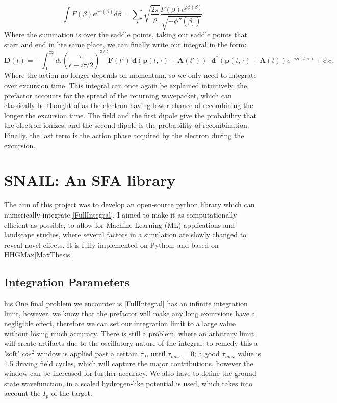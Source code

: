 \documentclass[11pt,a4paper]{report}
\begin{document}
\begin{equation}
\int F(\beta) e^{\rho\phi(\beta)} d\beta = \sum_s \sqrt{\frac{2\pi}{\rho}} \frac{F(\beta)e^{\rho\phi(\beta)}}{\sqrt{-\phi '' (\beta_s)}}
\end{equation}
Where the summation is over the saddle points, taking our saddle points that start and end in hte same place, we can finally write our integral in the form:
\begin{equation}
\mathbf{D}(t) = -\int_0^{\infty} d\tau \left( \frac{\pi}{\epsilon + i\tau/2}\right)^{3/2}\mathbf{F}(t')\: \mathbf{d} (\mathbf{p}(t,\tau) + \mathbf{A}(t'))\;\;\mathbf{d}^* (\mathbf{p}(t,\tau) + \mathbf{A}(t))  e^{-iS(t,\tau)} + c.c.
	\label{FullIntegral}
\end{equation}
Where the action no longer depends on momentum, so we only need to integrate over excursion time. This integral can once again be explained intuitively, the prefactor accounts for the spread of the returning wavepacket, which can classically be thought of as the electron having lower chance of recombining the longer the excursion time. The field and the first dipole give the probability that the electron ionizes, and the second dipole is the probability of recombination. Finally, the last term is the action phase acquired by the electron during the excursion.
\newpage
{}
\chapter{SNAIL: An SFA library}
\vspace{-10mm}
The aim of this project was to develop an open-source python library which can numerically integrate \eqref{FullIntegral}. I aimed to make it as computationally efficient as possible, to allow for Machine Learning (ML) applications and landscape studies, where several factors in a simulation are slowly changed to reveal novel effects. It is fully implemented on Python, and based on HHGMax\ref{MaxThesis}.
\section{Integration Parameters}
his One final problem we encounter is \eqref{FullIntegral} has an infinite integration limit, however, we know that the prefactor will make any long excursions have a negligible effect, therefore we can set our integration limit to a large value without losing much accuracy. There is still a problem, where an arbitrary limit will create artifacts due to the oscillatory nature of the integral, to remedy this a 'soft' $cos^2$ window is applied past a certain $\tau_{d}$, until $\tau_{max} = 0$; a good $\tau_{max}$ value is 1.5 driving field cycles, which will capture the major contributions, however the window can be increased for further accuracy. We also have to define the ground state wavefunction, in \cite{lewensteinog} a scaled hydrogen-like potential is used, which takes into account the $I_p$ of the target.\\
\end{document}
